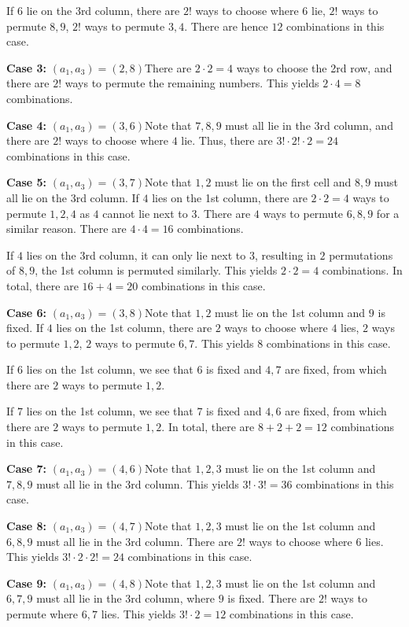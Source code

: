 \begin{enumerate}
 If $6$ lie on the 3rd column, there are $2!$ ways to choose where $6$ lie, $2!$ ways to permute $8,9$, $2!$ ways to permute $3,4$. There are hence $12$ combinations in this case.

 \textbf{Case 3: }$(a_1,a_3)=(2,8)$There are $2\cdot2=4$ ways to choose the 2rd row, and there are $2!$ ways to permute the remaining numbers. This yields $2\cdot 4=8$ combinations.

 \textbf{Case 4: }$(a_1,a_3)=(3,6)$Note that $7,8,9$ must all lie in the 3rd column, and there are $2!$ ways to choose where $4$ lie. Thus, there are $3!\cdot2!\cdot2=24$ combinations in this case.

 \textbf{Case 5: }$(a_1,a_3)=(3,7)$Note that $1,2$ must lie on the first cell and $8,9$ must all lie on the 3rd column. If $4$ lies on the 1st column, there are $2\cdot2=4$ ways to permute $1,2,4$ as $4$ cannot lie next to 3. There are $4$ ways to permute $6,8,9$ for a similar reason. There are $4\cdot4=16$ combinations.

 If $4$ lies on the 3rd column, it can only lie next to $3$, resulting in $2$ permutations of $8,9$, the 1st column is permuted similarly. This yields $2\cdot 2=4$ combinations. In total, there are $16+4=20$ combinations in this case.

 \textbf{Case 6: }$(a_1,a_3)=(3,8)$Note that $1,2$ must lie on the 1st column and $9$ is fixed. If $4$ lies on the 1st column, there are $2$ ways to choose where $4$ lies, $2$ ways to permute $1,2$, $2$ ways to permute $6,7$. This yields $8$ combinations in this case.

 If $6$ lies on the 1st column, we see that $6$ is fixed and $4,7$ are fixed, from which there are $2$ ways to permute $1,2$.

 If $7$ lies on the 1st column, we see that $7$ is fixed and $4,6$ are fixed, from which there are $2$ ways to permute $1,2$. In total, there are $8+2+2=12$ combinations in this case.

 \textbf{Case 7: }$(a_1,a_3)=(4,6)$Note that $1,2,3$ must lie on the 1st column and $7,8,9$ must all lie in the 3rd column. This yields $3!\cdot3!=36$ combinations in this case.

 \textbf{Case 8: }$(a_1,a_3)=(4,7)$Note that $1,2,3$ must lie on the 1st column and $6,8,9$ must all lie in the 3rd column. There are $2!$ ways to choose where $6$ lies. This yields $3!\cdot 2\cdot 2!=24$ combinations in this case.

 \textbf{Case 9: }$(a_1,a_3)=(4,8)$Note that $1,2,3$ must lie on the 1st column and $6,7,9$ must all lie in the 3rd column, where $9$ is fixed. There are $2!$ ways to permute where $6,7$ lies. This yields $3!\cdot 2=12$ combinations in this case.


\end{enumerate}

